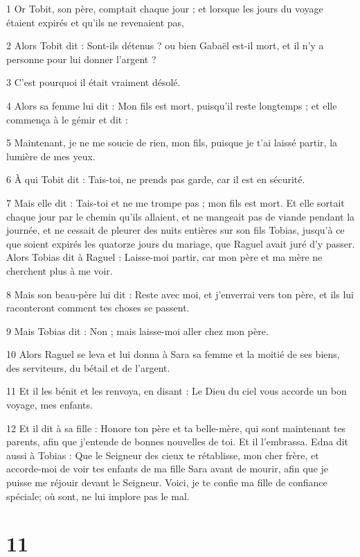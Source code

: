 \par 1 Or Tobit, son père, comptait chaque jour ; et lorsque les jours du voyage étaient expirés et qu'ils ne revenaient pas,
\par 2 Alors Tobit dit : Sont-ils détenus ? ou bien Gabaël est-il mort, et il n'y a personne pour lui donner l'argent ?
\par 3 C'est pourquoi il était vraiment désolé.
\par 4 Alors sa femme lui dit : Mon fils est mort, puisqu'il reste longtemps ; et elle commença à le gémir et dit :
\par 5 Maintenant, je ne me soucie de rien, mon fils, puisque je t'ai laissé partir, la lumière de mes yeux.
\par 6 À qui Tobit dit : Tais-toi, ne prends pas garde, car il est en sécurité.
\par 7 Mais elle dit : Tais-toi et ne me trompe pas ; mon fils est mort. Et elle sortait chaque jour par le chemin qu'ils allaient, et ne mangeait pas de viande pendant la journée, et ne cessait de pleurer des nuits entières sur son fils Tobias, jusqu'à ce que soient expirés les quatorze jours du mariage, que Raguel avait juré d'y passer. Alors Tobias dit à Raguel : Laisse-moi partir, car mon père et ma mère ne cherchent plus à me voir.
\par 8 Mais son beau-père lui dit : Reste avec moi, et j'enverrai vers ton père, et ils lui raconteront comment tes choses se passent.
\par 9 Mais Tobias dit : Non ; mais laisse-moi aller chez mon père.
\par 10 Alors Raguel se leva et lui donna à Sara sa femme et la moitié de ses biens, des serviteurs, du bétail et de l'argent.
\par 11 Et il les bénit et les renvoya, en disant : Le Dieu du ciel vous accorde un bon voyage, mes enfants.
\par 12 Et il dit à sa fille : Honore ton père et ta belle-mère, qui sont maintenant tes parents, afin que j'entende de bonnes nouvelles de toi. Et il l'embrassa. Edna dit aussi à Tobias : Que le Seigneur des cieux te rétablisse, mon cher frère, et accorde-moi de voir tes enfants de ma fille Sara avant de mourir, afin que je puisse me réjouir devant le Seigneur. Voici, je te confie ma fille de confiance spéciale; où sont, ne lui implore pas le mal.

\chapter{11}

